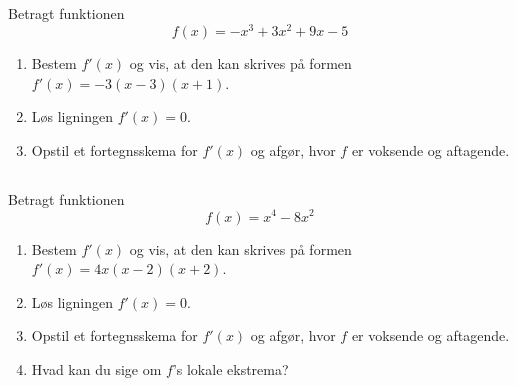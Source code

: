 \documentclass[10pt,a4paper,table]{article}
\begin{document}
\subsection{}
Betragt funktionen
\[
  f(x) = -x^3 + 3x^2 + 9x - 5
\]
\begin{enumerate}[label=\arabic*)]
  \item Bestem $f'(x)$ og vis, at den kan skrives på formen $f'(x) = -3(x-3)(x+1)$.
  \item Løs ligningen $f'(x) = 0$.
  \item Opstil et fortegnsskema for $f'(x)$ og afgør, hvor $f$ er voksende og aftagende.
\end{enumerate}

\subsection{}
Betragt funktionen
\[
  f(x) = x^4 - 8x^2
\]
\begin{enumerate}[label=\arabic*)]
  \item Bestem $f'(x)$ og vis, at den kan skrives på formen $f'(x) = 4x(x-2)(x+2)$.
  \item Løs ligningen $f'(x) = 0$.
  \item Opstil et fortegnsskema for $f'(x)$ og afgør, hvor $f$ er voksende og aftagende.
  \item Hvad kan du sige om $f$'s lokale ekstrema?
\end{enumerate}
\end{document}
